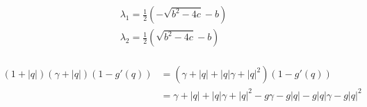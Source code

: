 \documentclass[11pt,a4paper]{article}
\begin{document}
	\begin{align*}
		\lambda_1 = \frac{1}{2}\left( - \sqrt{b^2 - 4c} -b \right) \\
		\lambda_2 = \frac{1}{2}\left( \sqrt{b^2 - 4c} -b \right) \\
	\end{align*}
	
	
	\begin{align*}
		(1+|q|)(\gamma + |q|)(1-g'(q)) &= (\gamma + |q| + |q|\gamma + |q|^2)(1-g'(q)) \\
		&= \gamma + |q| + |q|\gamma + |q|^2 - g \gamma - g|q| - g |q|\gamma - g |q|^2
	\end{align*}
	
	
	
\end{document}
